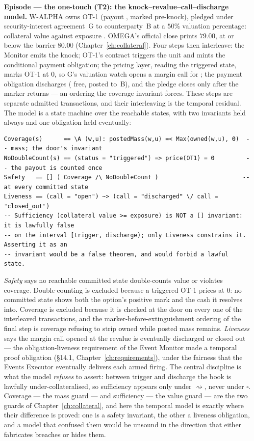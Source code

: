 \medskip\noindent\textbf{Episode --- the one-touch (T2): the knock--revalue--call--discharge
model.}
W-ALPHA owns OT-1 (payout , marked  pre-knock), pledged
under security-interest agreement~G to counterparty~B at a $50\%$ valuation percentage:
collateral value  against exposure . OMEGA's official close
prints $79.00$, at or below the barrier $80.00$ (Chapter~\ref{ch:collateral}). Four steps
then interleave: the Monitor emits the knock; OT-1's contract triggers the unit and mints the
conditional payment obligation; the pricing layer, reading the triggered state, marks OT-1 at
$0$, so G's valuation watch opens a margin call for ; the payment obligation
discharges  ( free,  posted to~B), and the
pledge closes only after the marker returns --- an ordering the coverage invariant forces.
These steps are separate admitted transactions, and their interleaving is the temporal
residual. The model is a state machine over the reachable states, with two invariants held
always and one obligation held eventually:

\begin{lstlisting}
Coverage(s)      == \A (w,u): postedMass(w,u) =< Max(owned(w,u), 0)  -- mass; the door's invariant
NoDoubleCount(s) == (status = "triggered") => price(OT1) = 0         -- the payout is counted once
Safety   == [] ( Coverage /\ NoDoubleCount )                        -- at every committed state
Liveness == (call = "open") ~> (call = "discharged" \/ call = "closed_out")
-- Sufficiency (collateral value >= exposure) is NOT a [] invariant: it is lawfully false
-- on the interval [trigger, discharge); only Liveness constrains it. Asserting it as an
-- invariant would be a false theorem, and would forbid a lawful state.
\end{lstlisting}

\emph{Safety} says no reachable committed state double-counts value or violates coverage.
Double-counting is excluded because a triggered OT-1 prices at $0$: no committed state shows
both the option's positive mark and the  cash it resolves into. Coverage
is excluded because it is checked at the door on every one of the interleaved transactions,
and the marker-before-extinguishment ordering of the final step is coverage refusing to
strip owned while posted mass remains. \emph{Liveness} says the margin call opened at the
revalue is eventually discharged or closed out --- the obligation-liveness requirement of the
Event Monitor made a temporal proof obligation (\S 14.1, Chapter~\ref{ch:requirements}),
under the fairness that the Events Executor eventually delivers each armed firing. The
central discipline is what the model \emph{refuses} to assert: between trigger and discharge
the book is lawfully under-collateralised, so sufficiency appears only under
$\rightsquigarrow$, never under $\square$. Coverage --- the mass guard --- and sufficiency ---
the value guard --- are the two guards of Chapter~\ref{ch:collateral}, and here the temporal
model is exactly where their difference is proved: one is a safety invariant, the other a
liveness obligation, and a model that confused them would be unsound in the direction that
either fabricates breaches or hides them.

